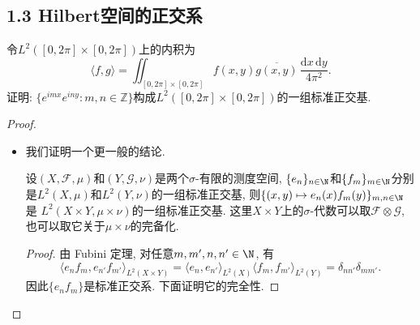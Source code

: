 \subsection{1.3 Hilbert空间的正交系}
\begin{3}
    令$L^2([0,2\pi]\times[0,2\pi])$上的内积为
    $$\langle f,g\rangle
    =\iint_{[0,2\pi]\times[0,2\pi]}
    f(x,y)\overline{g(x,y)}\,\frac{\mathrm{d}x\,\mathrm{d}y}{4\pi^2}.$$
    证明: $\{e^{imx}e^{iny}:m,n\in\mathbb Z\}$构成$L^2([0,2\pi]\times[0,2\pi])$的一组标准正交基.
\end{3}
\begin{proof}
    \begin{itemize}
        \item[方法一.] 我们证明一个更一般的结论.

    \begin{theorem}
        设$(X,\mathcal{F},\mu)$和$(Y,\mathcal{G},\nu)$是两个$\sigma$-有限的测度空间,
        $\{e_n\}_{n\in\N}$和$\{f_m\}_{m\in\N}$分别是$L^2(X,\mu)$和$L^2(Y,\nu)$的一组标准正交基,
        则$\{(x,y)\mapsto e_n(x)f_m(y)\}_{m,n\in\N}$是
        $L^2(X\times Y,\mu\times\nu)$的一组标准正交基.
        这里$X\times Y$上的$\sigma$-代数可以取$\mathcal{F}\otimes\mathcal{G}$,
        也可以取它关于$\mu\times\nu$的完备化.
    \end{theorem}

    \begin{proof}
        由 Fubini 定理, 对任意$m,m',n,n'\in\N$, 有
        $$\langle e_nf_m,e_{n'}f_{m'}\rangle_{L^2(X\times Y)}
        =\langle e_n,e_{n'}\rangle_{L^2(X)}
        \langle f_m,f_{m'}\rangle_{L^2(Y)}
        =\delta_{nn'}\delta_{mm'}.$$
        因此$\{e_nf_m\}$是标准正交系.
        下面证明它的完全性.


\end{proof}
\end{itemize}
\end{proof}

